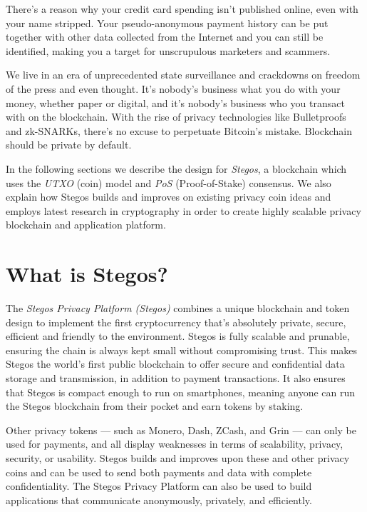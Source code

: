 \documentclass[8pt,fleqn,openany]{book}
\begin{document}
There’s a reason why your credit card spending isn’t published online, even with your name stripped. Your pseudo-anonymous payment history can be put together with other data collected from the Internet and you can still be identified, making you a target for unscrupulous marketers and scammers.

We live in an era of unprecedented state surveillance and crackdowns on freedom of the press and even thought. It’s nobody’s business what you do with your money, whether paper or digital, and it’s nobody's business who you transact with on the blockchain. With the rise of privacy technologies like Bulletproofs and zk-SNARKs, there’s no excuse to perpetuate Bitcoin’s mistake. Blockchain should be private by default.

In the following sections we describe the design for \textit{Stegos}, a blockchain which uses the \textit{UTXO} (coin) model and \textit{PoS} (Proof-of-Stake) consensus. We also explain how Stegos builds and improves on existing privacy coin ideas and employs latest research in cryptography in order to create highly scalable privacy blockchain and application platform. 

\chapter{What is Stegos?}\label{chap:what-is-stegos}

The \textit{Stegos Privacy Platform (Stegos)} combines a unique blockchain and token design to implement the first cryptocurrency that’s absolutely private, secure, efficient and friendly to the environment. Stegos is fully scalable and prunable, ensuring the chain is always kept small without compromising trust. This makes Stegos the world’s first public blockchain to offer secure and confidential data storage and transmission, in addition to payment transactions. It also ensures that Stegos is compact enough to run on smartphones, meaning anyone can run the Stegos blockchain from their pocket and earn tokens by staking.

Other privacy tokens — such as Monero, Dash, ZCash, and Grin — can only be used for payments, and all display weaknesses in terms of scalability, privacy, security, or usability. Stegos builds and improves upon these and other privacy coins and can be used to send both payments and data with complete confidentiality. The Stegos Privacy Platform can also be used to build applications that communicate anonymously, privately, and efficiently.
\end{document}
